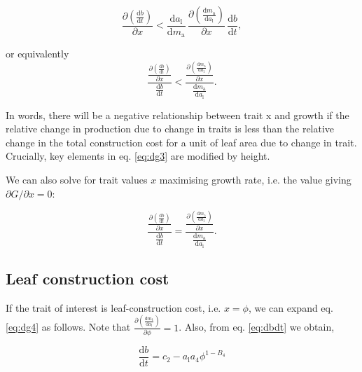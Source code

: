 \documentclass[12pt, a4paper]{article}
\begin{document}
\begin{appendices}
\begin{equation}\label{eq:dg3}
\frac{\partial \left( \frac{ \textrm{d}b} {\textrm{d}t}\right)}{\partial x}
< \frac{\textrm{d}a_\textrm{l}} {\textrm{d}m_\textrm{a}}
\,  \frac{\partial \left(\frac{\textrm{d}m_\textrm{a}} {\textrm{d}a_\textrm{l}}\right)
}{\partial x} \, \frac{ \textrm{d}b} {\textrm{d}t},
\end{equation}

or equivalently
\begin{equation}\label{eq:dg4}
\frac{
\frac{\partial \left( \frac{ \textrm{d}b} {\textrm{d}t}\right)}{\partial x} }
{\frac{ \textrm{d}b} {\textrm{d}t}}
<
\frac{ \frac{\partial \left(\frac{\textrm{d}m_\textrm{a}} {\textrm{d}a_\textrm{l}}\right)
}{\partial x}}{\frac{\textrm{d}m_\textrm{a}} {\textrm{d}a_\textrm{l}}}.
\end{equation}

In words, there will be a negative relationship between trait x and growth if the
relative change in production due to change in traits is less than the relative change
in the total construction cost for a unit of leaf area due to change in trait. Crucially,
key elements in eq. \ref{eq:dg3} are modified by height.

We can also solve for trait values $x$ maximising growth rate, i.e. the value
giving $\partial G /\partial x = 0$:

\begin{equation}\label{eq:max}
\frac{
\frac{\partial \left( \frac{ \textrm{d}b} {\textrm{d}t}\right)}{\partial x} }
{\frac{ \textrm{d}b} {\textrm{d}t}}
=
\frac{ \frac{\partial \left(\frac{\textrm{d}m_\textrm{a}} {\textrm{d}a_\textrm{l}}\right)
}{\partial x}}{\frac{\textrm{d}m_\textrm{a}} {\textrm{d}a_\textrm{l}}}.
\end{equation}

\subsection{Leaf construction cost}

If the trait of interest is leaf-construction cost, i.e. $x=\phi$, we can expand
eq. \ref{eq:dg4} as follows. Note that $\frac{\partial \left(\frac{\textrm{d}m_\textrm
{t}} {\textrm{d}a_\textrm{l}}\right)}{\partial \phi} = 1$. Also, from eq. \ref{eq:dbdt} we obtain,

\begin{equation}\label{eq:dbdt2}
\frac{\textrm{d}b}{\textrm{d}t} = c_2 - a_\textrm{l} a_4 \phi ^{1-B_4}
\end{equation}


\end{appendices}
\end{document}
